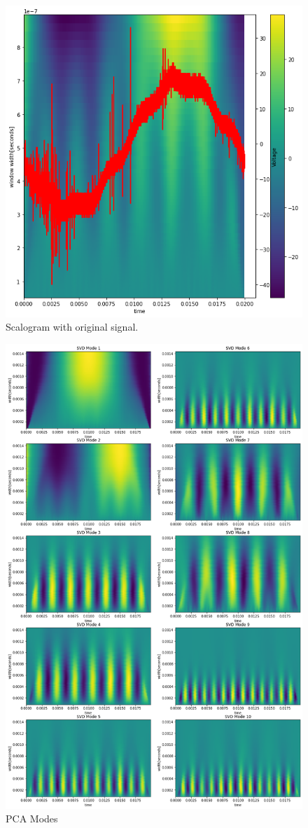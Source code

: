 \documentclass{article}
\begin{document}
\begin{figure}
    \centering
    \includegraphics[width=0.6\linewidth]{cwt.png}
    \caption{Scalogram with original signal.}
    \label{fig:scalogram}
\end{figure}

\begin{figure}
    \centering
    \includegraphics[width=0.8\linewidth]{pca_modes.png}
    \caption{PCA Modes}
    \label{fig:modes}
\end{figure}
\end{document}
